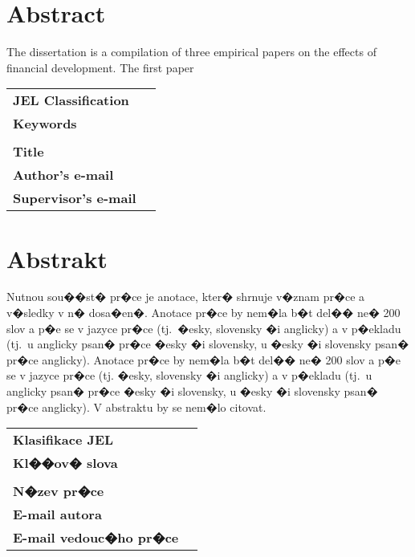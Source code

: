 \section*{Abstract}
The dissertation is a compilation of three empirical papers on the effects of financial development. The first paper 
\bigskip

\begin{tabular}{lp{8.6cm}}
		\textbf{JEL Classification} & \JEL \\
		\textbf{Keywords} & \Keywords \\
 		& \\
		\textbf{Title} & \Bookname \\
 		\textbf{Author's e-mail} & \texttt{\href{mailto:\Email}{\Email}}\\
		\textbf{Supervisor's e-mail} & \texttt{\href{mailto:\EmailSup}{\EmailSup}}\\
\end{tabular}

\bigskip

\section*{Abstrakt}\label{abstract}

Nutnou sou��st� pr�ce je anotace, kter� shrnuje v�znam pr�ce a v�sledky v n� dosa�en�. Anotace pr�ce by nem�la b�t del�� ne� 200 slov a p�e se v jazyce pr�ce (tj.\ �esky, slovensky �i anglicky) a v p�ekladu (tj.\ u anglicky psan� pr�ce �esky �i slovensky, u �esky �i slovensky psan� pr�ce anglicky). Anotace pr�ce by nem�la b�t del�� ne� 200 slov a p�e se v jazyce pr�ce (tj. �esky, slovensky �i anglicky) a v p�ekladu (tj.\ u anglicky psan� pr�ce �esky �i slovensky, u �esky �i slovensky psan� pr�ce anglicky). V abstraktu by se nem�lo citovat.

\bigskip

\begin{tabular}{lp{7.7cm}}
		\textbf{Klasifikace JEL} & \JEL \\
		\textbf{Kl��ov� slova} & \Klic \\
 		& \\
		\textbf{N�zev pr�ce} & \BooknameCZ \\
 		\textbf{E-mail autora} & \texttt{\href{mailto:\Email}{\Email}}\\
		\textbf{E-mail vedouc�ho pr�ce} & \texttt{\href{mailto:\EmailSup}{\EmailSup}}\\
\end{tabular}


